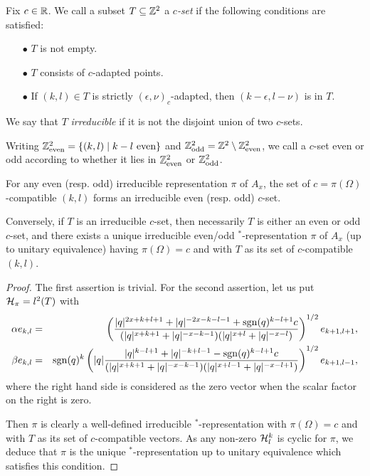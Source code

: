\begin{Def} Fix $c\in \mathbb{R}$. We call a subset $T\subseteq \mathbb{Z}^2$ a \emph{$c$-set} if the following conditions are satisfied: 
\begin{itemize} 
\item[$\bullet$] $T$ is not empty.
\item[$\bullet$] $T$ consists of $c$-adapted points.
\item[$\bullet$] If $(k,l)\in T$ is strictly $(\epsilon,\nu)_c$-adapted, then $(k-\epsilon,l-\nu)$ is in $T$.
\end{itemize}

We say that $T$ \emph{irreducible} if it is not the disjoint union of two $c$-sets.

Writing $\mathbb{Z}^2_{\mathrm{even}} = \{(k,l)\mid k-l \textrm{ even}\}$ and $\mathbb{Z}^2_{\mathrm{odd}} = \mathbb{Z}^2\setminus \mathbb{Z}^2_{\mathrm{even}}$, we call a $c$-set even or odd according to whether it lies in $\mathbb{Z}^2_{\mathrm{even}}$ or $\mathbb{Z}^2_{\mathrm{odd}}$.
\end{Def}

\begin{Prop}\label{PropClassRep} For any even (resp. odd) irreducible representation $\pi$ of $A_x$, the set of $c=\pi(\Omega)$-compatible $(k,l)$ forms an irreducible even (resp. odd) $c$-set. 

Conversely, if $T$ is an irreducible $c$-set, then necessarily $T$ is either an even or odd $c$-set, and there exists a unique irreducible even/odd $^*$-representation $\pi$ of $A_x$ (up to unitary equivalence) having $\pi(\Omega) = c $ and with $T$ as its set of $c$-compatible $(k,l)$.
\end{Prop}

\begin{proof} The first assertion is trivial. For the second assertion, let us put $\mathcal{H}_{\pi} = l^2(T)$ with  \begin{eqnarray*} \alpha e_{k,l} &=&  \left(\frac{|q|^{2x+k+l+1}+|q|^{-2x-k-l-1}+\operatorname{\mathrm{sgn}}(q)^{k-l+1}c}{(|q|^{x+k+1}+|q|^{-x-k-1})(|q|^{x+l}+|q|^{-x-l})}\right)^{1/2}e_{k+1,l+1},\\ \beta e_{k,l} &=& \operatorname{\mathrm{sgn}}(q)^{k}\left(|q|\frac{|q|^{k-l+1}+|q|^{-k+l-1}-\operatorname{\mathrm{sgn}}(q)^{k-l+1}c}{(|q|^{x+k+1}+|q|^{-x-k-1})(|q|^{x+l-1}+|q|^{-x-l+1})}\right)^{1/2} e_{k+1,l-1},\end{eqnarray*} where the right hand side is considered as the zero vector when the scalar factor on the right is zero. 

Then $\pi$ is clearly a well-defined irreducible $^*$-representation with $\pi(\Omega) =c$ and with $T$ as its set of $c$-compatible vectors. As any non-zero $\mathcal{H}^{k}_l$ is cyclic for $\pi$, we deduce that $\pi$ is the unique $^*$-representation up to unitary equivalence which satisfies this condition.
\end{proof}

